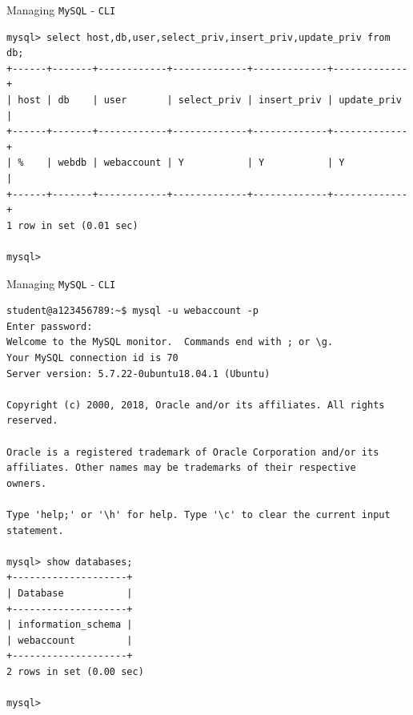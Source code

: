 \documentclass[xcolor=table]{beamer}
\begin{document}
\begin{frame}[fragile]{Managing \texttt{MySQL} - \texttt{CLI}}
  \begin{tcolorbox}
    \lstset{
      basicstyle=\Tiny\ttfamily,
    }
    \begin{lstlisting}
mysql> select host,db,user,select_priv,insert_priv,update_priv from db;
+------+-------+------------+-------------+-------------+-------------+
| host | db    | user       | select_priv | insert_priv | update_priv |
+------+-------+------------+-------------+-------------+-------------+
| %    | webdb | webaccount | Y           | Y           | Y           |
+------+-------+------------+-------------+-------------+-------------+
1 row in set (0.01 sec)
      
mysql>     
    \end{lstlisting}
  \end{tcolorbox}
\end{frame}

\begin{frame}[fragile]{Managing \texttt{MySQL} - \texttt{CLI}}
  \begin{tcolorbox}
    \lstset{
      basicstyle=\Tiny\ttfamily,
    }
    \begin{lstlisting}
student@a123456789:~$ mysql -u webaccount -p
Enter password:
Welcome to the MySQL monitor.  Commands end with ; or \g.
Your MySQL connection id is 70
Server version: 5.7.22-0ubuntu18.04.1 (Ubuntu)
      
Copyright (c) 2000, 2018, Oracle and/or its affiliates. All rights reserved.
     
Oracle is a registered trademark of Oracle Corporation and/or its
affiliates. Other names may be trademarks of their respective
owners.
      
Type 'help;' or '\h' for help. Type '\c' to clear the current input statement.
      
mysql> show databases;
+--------------------+
| Database           |
+--------------------+
| information_schema |
| webaccount         |
+--------------------+
2 rows in set (0.00 sec)
      
mysql>
    \end{lstlisting}
  \end{tcolorbox}
\end{frame}
\end{document}
